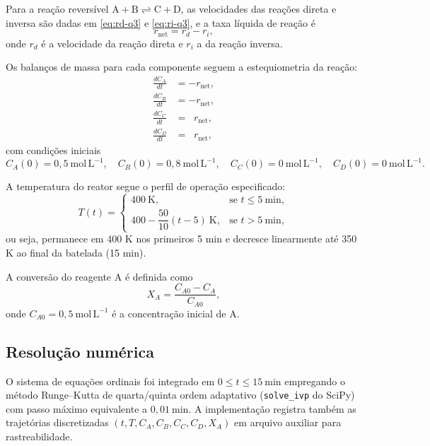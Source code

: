 \documentclass{article}
\begin{document}
Para a reação reversível $\mathrm{A} + \mathrm{B} \rightleftharpoons \mathrm{C} + \mathrm{D}$, as velocidades das reações direta e inversa são dadas em \eqref{eq:rd-q3} e \eqref{eq:ri-q3}, e a taxa líquida de reação é
\begin{equation}
  r_{\text{net}} = r_d - r_i, \label{eq:rnet-q3}
\end{equation}
onde $r_d$ é a velocidade da reação direta e $r_i$ a da reação inversa.

Os balanços de massa para cada componente seguem a estequiometria da reação:
\begin{align}
  \frac{dC_A}{dt} &= -r_{\text{net}}, \label{eq:balanco-A-q3} \\
  \frac{dC_B}{dt} &= -r_{\text{net}}, \label{eq:balanco-B-q3} \\
  \frac{dC_C}{dt} &= \;\;r_{\text{net}}, \label{eq:balanco-C-q3} \\
  \frac{dC_D}{dt} &= \;\;r_{\text{net}}, \label{eq:balanco-D-q3}
\end{align}
com condições iniciais
\begin{equation*}
  C_A(0) = 0{,}5\ \mathrm{mol\,L^{-1}}, \quad
  C_B(0) = 0{,}8\ \mathrm{mol\,L^{-1}}, \quad
  C_C(0) = 0\ \mathrm{mol\,L^{-1}}, \quad
  C_D(0) = 0\ \mathrm{mol\,L^{-1}}.
\end{equation*}

A temperatura do reator segue o perfil de operação especificado:
\begin{equation}
  T(t) = \begin{cases}
    400\ \mathrm{K}, & \text{se } t \leq 5\ \mathrm{min}, \\
    400 - \dfrac{50}{10}(t - 5)\ \mathrm{K}, & \text{se } t > 5\ \mathrm{min},
  \end{cases}
  \label{eq:temperatura-q3}
\end{equation}
ou seja, permanece em 400 K nos primeiros 5 min e decresce linearmente até 350 K ao final da batelada (15 min).

A conversão do reagente A é definida como
\begin{equation}
  X_A = \frac{C_{A0} - C_A}{C_{A0}}, \label{eq:conversao-q3}
\end{equation}
onde $C_{A0} = 0{,}5\ \mathrm{mol\,L^{-1}}$ é a concentração inicial de A.

\subsection*{Resolução numérica}
O sistema de equações ordinais foi integrado em $0 \leq t \leq 15\ \mathrm{min}$ empregando o método Runge--Kutta de quarta/quinta ordem adaptativo (\texttt{solve\_ivp} do SciPy) com passo máximo equivalente a $0{,}01\ \mathrm{min}$. A implementação registra também as trajetórias discretizadas $(t, T, C_A, C_B, C_C, C_D, X_A)$ em arquivo auxiliar para rastreabilidade.
\end{document}
